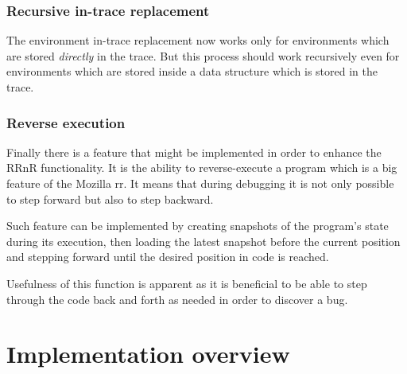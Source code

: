 \documentclass[thesis=M,english,hidelinks]{FITthesis}[2012/10/20]
\begin{document}
		\subsection{Recursive in-trace replacement}
		The environment in-trace replacement now works only for environments which are stored \emph{directly} in the trace. But this process should work recursively even for environments which are stored inside a data structure which is stored in the trace.\par
		
		\subsection{Reverse execution}
		Finally there is a feature that might be implemented in order to enhance the RRnR functionality. It is the ability to reverse-execute a program which is a big feature of the Mozilla rr. It means that during debugging it is not only possible to step forward but also to step backward.\par
		
		Such feature can be implemented by creating snapshots of the program's state during its execution, then loading the latest snapshot before the current position and stepping forward until the desired position in code is reached.\par
		
		Usefulness of this function is apparent as it is beneficial to be able to step through the code back and forth as needed in order to discover a bug.\par




\appendix

\chapter{Implementation overview}
\end{document}
